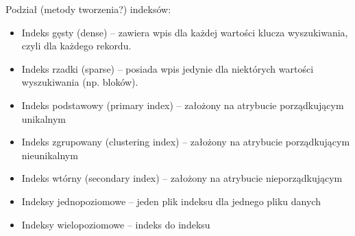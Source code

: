 \documentclass[12pt,a4paper]{article}
\begin{document}
	Podział (metody tworzenia?) indeksów:
	\begin{itemize}
		\item Indeks gęsty (dense) – zawiera wpis dla każdej wartości klucza wyszukiwania, czyli dla każdego rekordu.
		\item Indeks rzadki (sparse) – posiada wpis jedynie dla niektórych wartości wyszukiwania (np. bloków).
		\item Indeks podstawowy (primary index) – założony na atrybucie porządkującym unikalnym
		\item Indeks zgrupowany (clustering index) – założony na atrybucie porządkującym nieunikalnym
		\item Indeks wtórny (secondary index) – założony na atrybucie nieporządkującym
		\item Indeksy jednopoziomowe – jeden plik indeksu dla jednego pliku danych
		\item Indeksy wielopoziomowe – indeks do indeksu
	\end{itemize}
\end{document}
